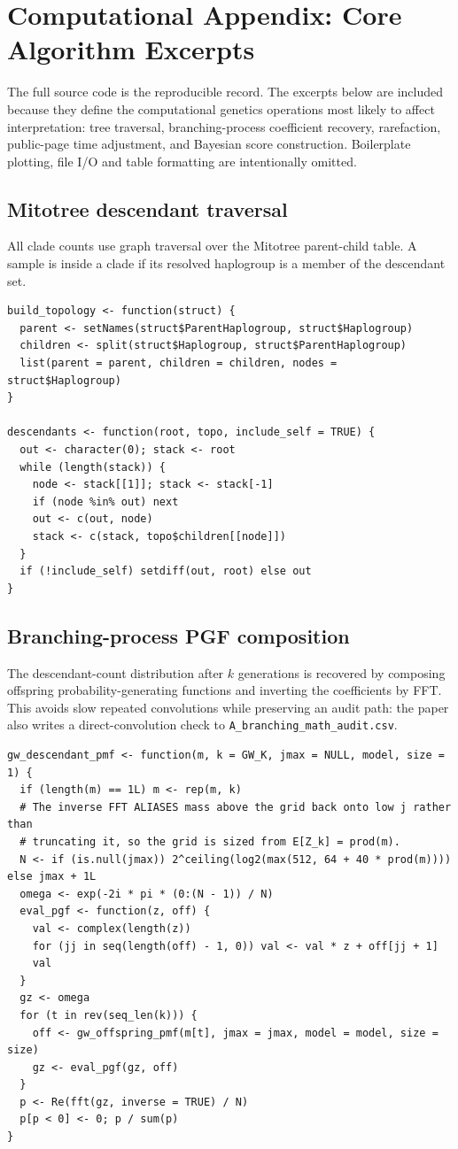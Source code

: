 \documentclass[11pt]{article}
\begin{document}
\section{Computational Appendix: Core Algorithm Excerpts}
\label{app:code}
The full source code is the reproducible record. The excerpts below are included because they define the computational genetics operations most likely to affect interpretation: tree traversal, branching-process coefficient recovery, rarefaction, public-page time adjustment, and Bayesian score construction. Boilerplate plotting, file I/O and table formatting are intentionally omitted.

\subsection{Mitotree descendant traversal}
All clade counts use graph traversal over the Mitotree parent-child table. A sample is inside a clade if its resolved haplogroup is a member of the descendant set.

\begingroup\footnotesize
\begin{verbatim}
build_topology <- function(struct) {
  parent <- setNames(struct$ParentHaplogroup, struct$Haplogroup)
  children <- split(struct$Haplogroup, struct$ParentHaplogroup)
  list(parent = parent, children = children, nodes = struct$Haplogroup)
}

descendants <- function(root, topo, include_self = TRUE) {
  out <- character(0); stack <- root
  while (length(stack)) {
    node <- stack[[1]]; stack <- stack[-1]
    if (node %in% out) next
    out <- c(out, node)
    stack <- c(stack, topo$children[[node]])
  }
  if (!include_self) setdiff(out, root) else out
}
\end{verbatim}
\endgroup
\subsection{Branching-process PGF composition}
The descendant-count distribution after $k$ generations is recovered by composing offspring probability-generating functions and inverting the coefficients by FFT. This avoids slow repeated convolutions while preserving an audit path: the paper also writes a direct-convolution check to \texttt{A\_branching\_math\_audit.csv}.

\begingroup\footnotesize
\begin{verbatim}
gw_descendant_pmf <- function(m, k = GW_K, jmax = NULL, model, size = 1) {
  if (length(m) == 1L) m <- rep(m, k)
  # The inverse FFT ALIASES mass above the grid back onto low j rather than
  # truncating it, so the grid is sized from E[Z_k] = prod(m).
  N <- if (is.null(jmax)) 2^ceiling(log2(max(512, 64 + 40 * prod(m)))) else jmax + 1L
  omega <- exp(-2i * pi * (0:(N - 1)) / N)
  eval_pgf <- function(z, off) {
    val <- complex(length(z))
    for (jj in seq(length(off) - 1, 0)) val <- val * z + off[jj + 1]
    val
  }
  gz <- omega
  for (t in rev(seq_len(k))) {
    off <- gw_offspring_pmf(m[t], jmax = jmax, model = model, size = size)
    gz <- eval_pgf(gz, off)
  }
  p <- Re(fft(gz, inverse = TRUE) / N)
  p[p < 0] <- 0; p / sum(p)
}
\end{verbatim}
\endgroup
\end{document}
